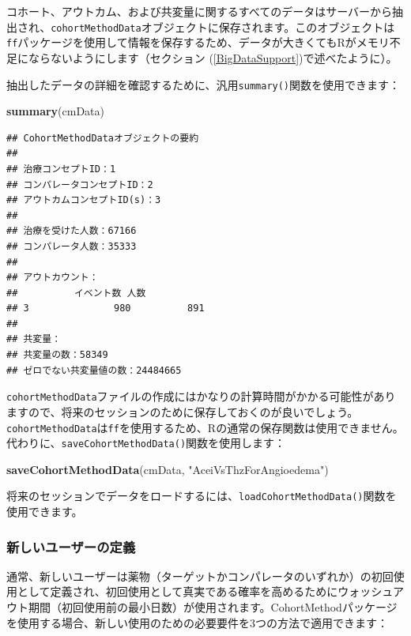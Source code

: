 \documentclass[
  11pt]{book}
\newenvironment{Shaded}{\begin{snugshade}}{\end{snugshade}}
\newcommand{\FunctionTok}[1]{\textcolor[rgb]{0.13,0.29,0.53}{\textbf{#1}}}
\newcommand{\NormalTok}[1]{#1}
\newcommand{\StringTok}[1]{\textcolor[rgb]{0.31,0.60,0.02}{#1}}
\theoremstyle{definition}
\theoremstyle{definition}
\theoremstyle{definition}
\theoremstyle{definition}
\theoremstyle{remark}
\begin{document}
コホート、アウトカム、および共変量に関するすべてのデータはサーバーから抽出され、\texttt{cohortMethodData}オブジェクトに保存されます。このオブジェクトは\texttt{ff}パッケージを使用して情報を保存するため、データが大きくてもRがメモリ不足にならないようにします（セクション (\ref{BigDataSupport})で述べたように）。

抽出したデータの詳細を確認するために、汎用\texttt{summary()}関数を使用できます：

\begin{Shaded}
\begin{Highlighting}[]
\FunctionTok{summary}\NormalTok{(cmData)}
\end{Highlighting}
\end{Shaded}

\begin{verbatim}
## CohortMethodDataオブジェクトの要約
## 
## 治療コンセプトID：1
## コンパレータコンセプトID：2
## アウトカムコンセプトID(s)：3
## 
## 治療を受けた人数：67166
## コンパレータ人数：35333
## 
## アウトカウント：
##          イベント数 人数
## 3               980          891
## 
## 共変量：
## 共変量の数：58349
## ゼロでない共変量値の数：24484665
\end{verbatim}

\texttt{cohortMethodData}ファイルの作成にはかなりの計算時間がかかる可能性がありますので、将来のセッションのために保存しておくのが良いでしょう。\texttt{cohortMethodData}は\texttt{ff}を使用するため、Rの通常の保存関数は使用できません。代わりに、\texttt{saveCohortMethodData()}関数を使用します：

\begin{Shaded}
\begin{Highlighting}[]
\FunctionTok{saveCohortMethodData}\NormalTok{(cmData, }\StringTok{"AceiVsThzForAngioedema"}\NormalTok{)}
\end{Highlighting}
\end{Shaded}

将来のセッションでデータをロードするには、\texttt{loadCohortMethodData()}関数を使用できます。

\subsubsection*{新しいユーザーの定義}\label{ux65b0ux3057ux3044ux30e6ux30fcux30b6ux30fcux306eux5b9aux7fa9}

通常、新しいユーザーは薬物（ターゲットかコンパレータのいずれか）の初回使用として定義され、初回使用として真実である確率を高めるためにウォッシュアウト期間（初回使用前の最小日数）が使用されます。CohortMethodパッケージを使用する場合、新しい使用のための必要要件を3つの方法で適用できます：
\end{document}
